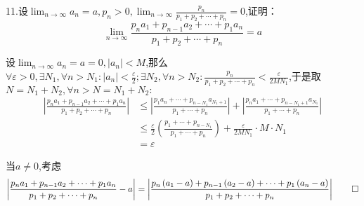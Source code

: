 11.设$\displaystyle\lim_{n\to\infty}a_n=a,p_n>0,\lim_{n\to\infty}\frac{p_n}{p_1+p_2+\cdots+p_n}=0$,证明：\[
\lim_{n\to\infty}\frac{p_na_1+p_{n-1}a_2+\cdots+p_1a_n}{p_1+p_2+\cdots+p_n}=a
\]
\begin{Proof}
    设$\displaystyle\lim_{n\to\infty}a_n=a=0,\left|a_n\right|<M$,那么$\displaystyle\forall\varepsilon>0,\exists N_1,\forall n>N_1:\left|a_n\right|<\frac{\varepsilon}{2};\exists N_2,\forall n>N_2:\frac{p_n}{p_1+p_2+\cdots+p_n}<\frac{\varepsilon}{2MN_1}$,于是取$N=N_1+N_2,\forall n>N=N_1+N_2:$\begin{align*}
        \left|
            \frac{p_na_1+p_{n-1}a_2+\cdots+p_1a_n}{p_1+p_2+\cdots+p_n}
        \right|&\leqslant\left|
            \frac{p_1a_n+\cdots+p_{n-N_1}a_{N_1+1}}{p_1+\cdots+p_n}
        \right|+\left|
            \frac{p_na_1+\cdots+p_{n-N_1+1}a_{N_1}}{p_1+\cdots+p_n}
        \right|\\
        &\leqslant\frac{\varepsilon}{2}\left(
            \frac{p_1+\cdots+p_{n-N_1}}{p_1+\cdots+p_n}
        \right)+\frac{\varepsilon}{2MN_1}\cdot M\cdot N_1\\
        &=\varepsilon
    \end{align*}

    当$a\neq0$,考虑\[
    \left|
        \frac{p_na_1+p_{n-1}a_2+\cdots+p_1a_n}{p_1+p_2+\cdots+p_n}-a
    \right|=\left|
        \frac{
            p_n\left(a_1-a\right)+p_{n-1}\left(a_2-a\right)+\cdots+p_1\left(a_n-a\right)
        }{
            p_1+p_2+\cdots+p_n
        }
    \right|\qedhere
    \]
\end{Proof}